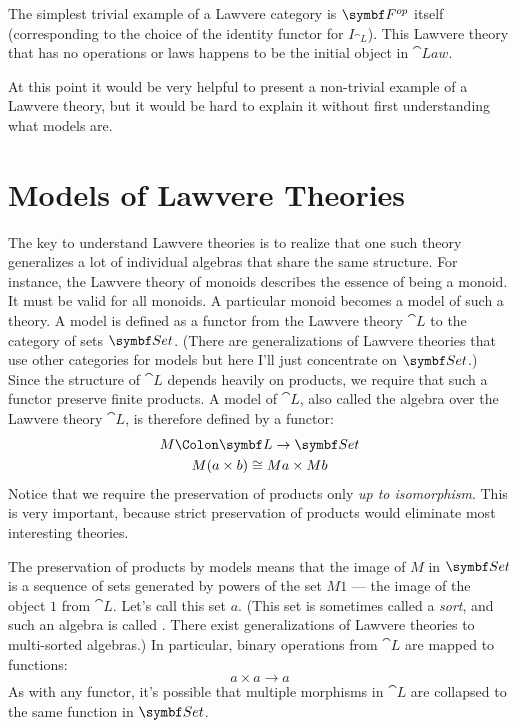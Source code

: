 The simplest trivial example of a Lawvere category is
$\Fop$ itself (corresponding to the choice of
the identity functor for $I_{\cat{L}}$). This Lawvere theory that has no
operations or laws happens to be the initial object in $\cat{Law}$.

At this point it would be very helpful to present a non-trivial example
of a Lawvere theory, but it would be hard to explain it without first
understanding what models are.

\section{Models of Lawvere Theories}

The key to understand Lawvere theories is to realize that one such
theory generalizes a lot of individual algebras that share the same
structure. For instance, the Lawvere theory of monoids describes the
essence of being a monoid. It must be valid for all monoids. A
particular monoid becomes a model of such a theory. A model is defined
as a functor from the Lawvere theory $\cat{L}$ to the category of sets
$\Set$. (There are generalizations of Lawvere theories that use
other categories for models but here I'll just concentrate on
$\Set$.) Since the structure of $\cat{L}$ depends heavily on
products, we require that such a functor preserve finite products. A
model of $\cat{L}$, also called the algebra over the Lawvere theory
$\cat{L}$, is therefore defined by a functor:
\begin{gather*}
  M \Colon \cat{L} \to \Set \\
  M (a \times b) \cong M a \times M b
\end{gather*}
Notice that we require the preservation of products only \emph{up to
  isomorphism}. This is very important, because strict preservation of
products would eliminate most interesting theories.

The preservation of products by models means that the image of
$M$ in $\Set$ is a sequence of sets generated by powers of
the set $M 1$ --- the image of the object $1$ from
$\cat{L}$. Let's call this set $a$. (This set is sometimes
called a \emph{sort}, and such an algebra is called . There
exist generalizations of Lawvere theories to multi-sorted algebras.) In
particular, binary operations from $\cat{L}$ are mapped to functions:
\[a \times a \to a\]
As with any functor, it's possible that multiple morphisms in $\cat{L}$
are collapsed to the same function in $\Set$.

